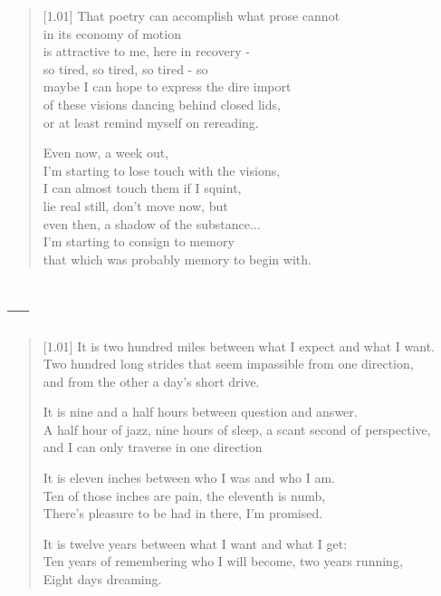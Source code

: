 \begin{verse}[1.01\textwidth]
That poetry can accomplish what prose cannot\\
in its economy of motion\\
is attractive to me, here in recovery -\\
\vin so tired, so tired, so tired - so\\
maybe I can hope to express the dire import\\
of these visions dancing behind closed lids,\\
or at least remind myself on rereading.

\newpage
\null
\vspace{0.01em}

Even now, a week out,\\
I'm starting to lose touch with the visions,\\
I can almost touch them if I squint,\\
\vin lie real still, don't move now, but\\
even then, a shadow of the substance...\\
I'm starting to consign to memory\\
that which was probably memory to begin with.
\end{verse}

\newpage
\subsection{---}

\begin{verse}[1.01\textwidth]
It is two hundred miles between what I expect and what I want.\\
Two hundred long strides that seem impassible from one direction,\\
\vin and from the other a day's short drive.

It is nine and a half hours between question and answer.\\
A half hour of jazz, nine hours of sleep, a scant second of perspective,\\
\vin and I can only traverse in one direction

It is eleven inches between who I was and who I am.\\
Ten of those inches are pain, the eleventh is numb,\\
\vin There's pleasure to be had in there, I'm promised.

It is twelve years between what I want and what I get:\\
Ten years of remembering who I will become, two years running,\\
\vin Eight days dreaming.
\end{verse}

